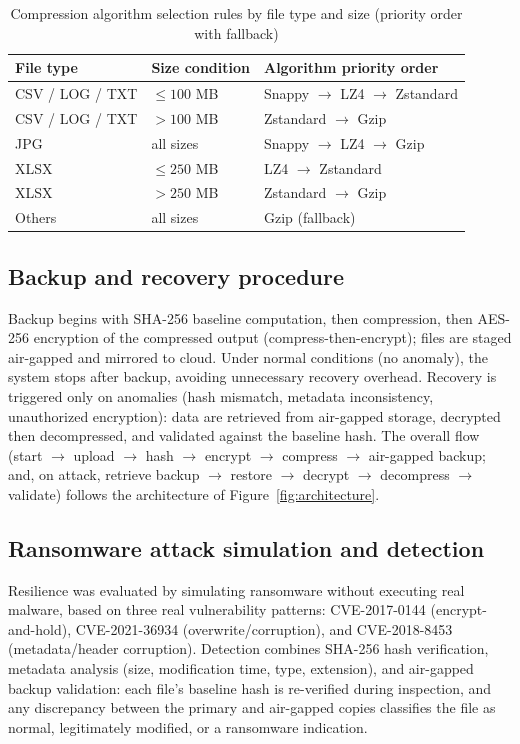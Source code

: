 \documentclass{iaesarticle}
\begin{document}
\begin{table}[htbp]
\centering
\fontsize{8pt}{10pt}\selectfont
\caption{Compression algorithm selection rules by file type and size (priority order with fallback)}
\label{tab:rule_selection}
\begin{tabular}{l l l}
\hline
\textbf{File type} & \textbf{Size condition} & \textbf{Algorithm priority order} \\
\hline
CSV / LOG / TXT & $\leq 100$ MB & Snappy $\rightarrow$ LZ4 $\rightarrow$ Zstandard \\
CSV / LOG / TXT & $> 100$ MB & Zstandard $\rightarrow$ Gzip \\
JPG & all sizes & Snappy $\rightarrow$ LZ4 $\rightarrow$ Gzip \\
XLSX & $\leq 250$ MB & LZ4 $\rightarrow$ Zstandard \\
XLSX & $> 250$ MB & Zstandard $\rightarrow$ Gzip \\
Others & all sizes & Gzip (fallback) \\
\hline
\end{tabular}
\end{table}

\subsection{Backup and recovery procedure}
Backup begins with SHA-256 baseline computation, then compression, then AES-256 encryption of the compressed output (compress-then-encrypt); files are staged air-gapped and mirrored to cloud. Under normal conditions (no anomaly), the system stops after backup, avoiding unnecessary recovery overhead. Recovery is triggered only on anomalies (hash mismatch, metadata inconsistency, unauthorized encryption): data are retrieved from air-gapped storage, decrypted then decompressed, and validated against the baseline hash. The overall flow (start $\rightarrow$ upload $\rightarrow$ hash $\rightarrow$ encrypt $\rightarrow$ compress $\rightarrow$ air-gapped backup; and, on attack, retrieve backup $\rightarrow$ restore $\rightarrow$ decrypt $\rightarrow$ decompress $\rightarrow$ validate) follows the architecture of Figure~\ref{fig:architecture}.

\subsection{Ransomware attack simulation and detection}
Resilience was evaluated by simulating ransomware without executing real malware, based on three real vulnerability patterns: CVE-2017-0144 (encrypt-and-hold), CVE-2021-36934 (overwrite/corruption), and CVE-2018-8453 (metadata/header corruption). Detection combines SHA-256 hash verification, metadata analysis (size, modification time, type, extension), and air-gapped backup validation: each file's baseline hash is re-verified during inspection, and any discrepancy between the primary and air-gapped copies classifies the file as normal, legitimately modified, or a ransomware indication.
\end{document}
